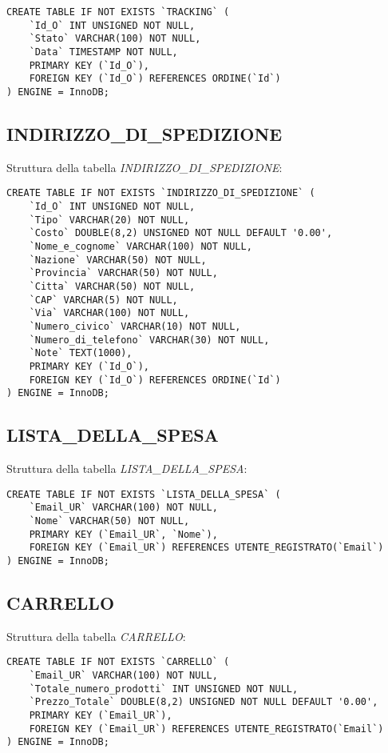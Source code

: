 \begin{lstlisting}
CREATE TABLE IF NOT EXISTS `TRACKING` (
	`Id_O` INT UNSIGNED NOT NULL,
	`Stato` VARCHAR(100) NOT NULL,
	`Data` TIMESTAMP NOT NULL,
	PRIMARY KEY (`Id_O`),
	FOREIGN KEY (`Id_O`) REFERENCES ORDINE(`Id`)
) ENGINE = InnoDB;
\end{lstlisting}

\subsection{INDIRIZZO\_DI\_SPEDIZIONE}
Struttura della tabella \emph{INDIRIZZO\_DI\_SPEDIZIONE}:

\begin{lstlisting}
CREATE TABLE IF NOT EXISTS `INDIRIZZO_DI_SPEDIZIONE` (
	`Id_O` INT UNSIGNED NOT NULL,
	`Tipo` VARCHAR(20) NOT NULL,
	`Costo` DOUBLE(8,2) UNSIGNED NOT NULL DEFAULT '0.00',
	`Nome_e_cognome` VARCHAR(100) NOT NULL,
	`Nazione` VARCHAR(50) NOT NULL,
	`Provincia` VARCHAR(50) NOT NULL,
	`Citta` VARCHAR(50) NOT NULL,
	`CAP` VARCHAR(5) NOT NULL,
	`Via` VARCHAR(100) NOT NULL,
	`Numero_civico` VARCHAR(10) NOT NULL,
	`Numero_di_telefono` VARCHAR(30) NOT NULL,
	`Note` TEXT(1000),
	PRIMARY KEY (`Id_O`),
	FOREIGN KEY (`Id_O`) REFERENCES ORDINE(`Id`)
) ENGINE = InnoDB;
\end{lstlisting}

\subsection{LISTA\_DELLA\_SPESA}
Struttura della tabella \emph{LISTA\_DELLA\_SPESA}:

\begin{lstlisting}
CREATE TABLE IF NOT EXISTS `LISTA_DELLA_SPESA` (
	`Email_UR` VARCHAR(100) NOT NULL,
	`Nome` VARCHAR(50) NOT NULL,
	PRIMARY KEY (`Email_UR`, `Nome`),
	FOREIGN KEY (`Email_UR`) REFERENCES UTENTE_REGISTRATO(`Email`)
) ENGINE = InnoDB;
\end{lstlisting}

\newpage

\subsection{CARRELLO}
Struttura della tabella \emph{CARRELLO}:

\begin{lstlisting}
CREATE TABLE IF NOT EXISTS `CARRELLO` (
	`Email_UR` VARCHAR(100) NOT NULL,
	`Totale_numero_prodotti` INT UNSIGNED NOT NULL,
	`Prezzo_Totale` DOUBLE(8,2) UNSIGNED NOT NULL DEFAULT '0.00',
	PRIMARY KEY (`Email_UR`),
	FOREIGN KEY (`Email_UR`) REFERENCES UTENTE_REGISTRATO(`Email`)
) ENGINE = InnoDB;
\end{lstlisting}

